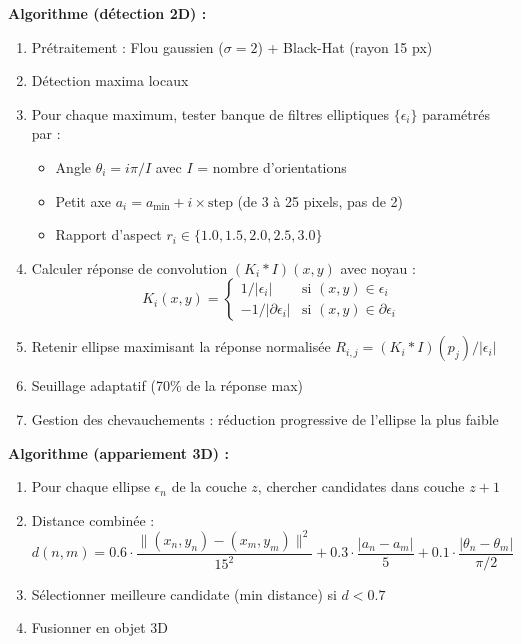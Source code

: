 \textbf{Algorithme (détection 2D) :}
\begin{enumerate}
    \item Prétraitement : Flou gaussien ($\sigma=2$) + Black-Hat (rayon 15 px)
    \item Détection maxima locaux
    \item Pour chaque maximum, tester banque de filtres elliptiques $\{\epsilon_i\}$ paramétrés par :
        \begin{itemize}
            \item Angle $\theta_i = i\pi / I$ avec $I$ = nombre d'orientations
            \item Petit axe $a_i = a_{\min} + i \times \text{step}$ (de 3 à 25 pixels, pas de 2)
            \item Rapport d'aspect $r_i \in \{1.0, 1.5, 2.0, 2.5, 3.0\}$
        \end{itemize}
    \item Calculer réponse de convolution $(K_i * I)(x, y)$ avec noyau :
        \[
        K_i(x, y) = \begin{cases}
            1/|\epsilon_i| & \text{si } (x, y) \in \epsilon_i \\
            -1/|\partial \epsilon_i| & \text{si } (x, y) \in \partial \epsilon_i
        \end{cases}
        \]
    \item Retenir ellipse maximisant la réponse normalisée $R_{i,j} = (K_i * I)(p_j) / |\epsilon_i|$
    \item Seuillage adaptatif (70\% de la réponse max)
    \item Gestion des chevauchements : réduction progressive de l'ellipse la plus faible
\end{enumerate}

\textbf{Algorithme (appariement 3D) :}
\begin{enumerate}
    \item Pour chaque ellipse $\epsilon_n$ de la couche $z$, chercher candidates dans couche $z+1$
    \item Distance combinée :
        \[
        d(n, m) = 0.6 \cdot \frac{\|(x_n, y_n) - (x_m, y_m)\|^2}{15^2} + 0.3 \cdot \frac{|a_n - a_m|}{5} + 0.1 \cdot \frac{|\theta_n - \theta_m|}{\pi/2}
        \]
    \item Sélectionner meilleure candidate (min distance) si $d < 0.7$
    \item Fusionner en objet 3D
\end{enumerate}

